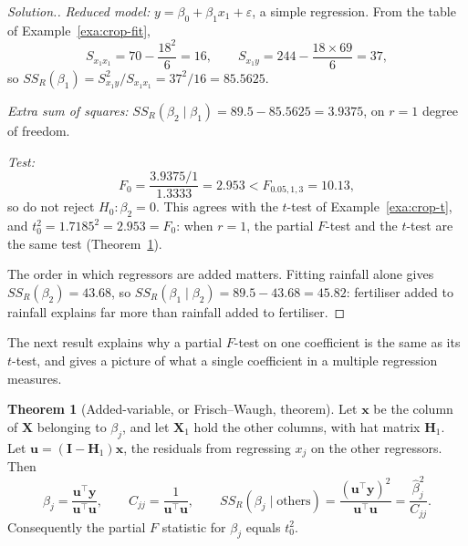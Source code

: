 \documentclass[11pt,a4paper]{article}
\numberwithin{equation}{section}
\theoremstyle{definition}
\newtheorem{thm}{Theorem}[subsection]
\newenvironment{solution}
  {\renewcommand{\qedsymbol}{}\begin{proof}[\textit{Solution}.]}
  {\end{proof}}
\begin{document}
\begin{solution}
\emph{Reduced model:} $y = \beta_0 + \beta_1 x_1 + \varepsilon$, a simple regression. From the
table of Example~\ref{exa:crop-fit},
\[
S_{x_1x_1} = 70 - \frac{18^2}{6} = 16, \qquad S_{x_1y} = 244 - \frac{18 \times 69}{6} = 37,
\]
so $SS_R(\beta_1) = S_{x_1y}^2/S_{x_1x_1} = 37^2/16 = 85.5625$.

\emph{Extra sum of squares:}
$SS_R(\beta_2 \mid \beta_1) = 89.5 - 85.5625 = 3.9375$, on $r = 1$ degree of freedom.

\emph{Test:}
\[
F_0 = \frac{3.9375/1}{1.3333} = 2.953 < F_{0.05,1,3} = 10.13 ,
\]
so do not reject $H_0\colon \beta_2 = 0$. This agrees with the $t$-test of
Example~\ref{exa:crop-t}, and $t_0^2 = 1.7185^2 = 2.953 = F_0$: when $r = 1$, the partial
$F$-test and the $t$-test are the same test (Theorem~\ref{thm:added-variable}).

The order in which regressors are added matters. Fitting rainfall alone gives
$SS_R(\beta_2) = 43.68$, so $SS_R(\beta_1 \mid \beta_2) = 89.5 - 43.68 = 45.82$: fertiliser
added to rainfall explains far more than rainfall added to fertiliser.
\end{solution}

The next result explains why a partial $F$-test on one coefficient is the same as its
$t$-test, and gives a picture of what a single coefficient in a multiple regression measures.

\begin{thm}[Added-variable, or Frisch--Waugh, theorem]\label{thm:added-variable}
Let $\mathbf{x}$ be the column of $\mathbf{X}$ belonging to $\beta_j$, and let $\mathbf{X}_1$
hold the other columns, with hat matrix $\mathbf{H}_1$. Let
$\mathbf{u} = (\mathbf{I} - \mathbf{H}_1)\mathbf{x}$, the residuals from regressing $x_j$ on
the other regressors. Then
\[
\hat\beta_j = \frac{\mathbf{u}^\top\mathbf{y}}{\mathbf{u}^\top\mathbf{u}}, \qquad
C_{jj} = \frac{1}{\mathbf{u}^\top\mathbf{u}}, \qquad
SS_R(\beta_j \mid \text{others}) = \frac{(\mathbf{u}^\top\mathbf{y})^2}{\mathbf{u}^\top\mathbf{u}} = \frac{\hat\beta_j^2}{C_{jj}} .
\]
Consequently the partial $F$ statistic for $\beta_j$ equals $t_0^2$.
\end{thm}
\end{document}
